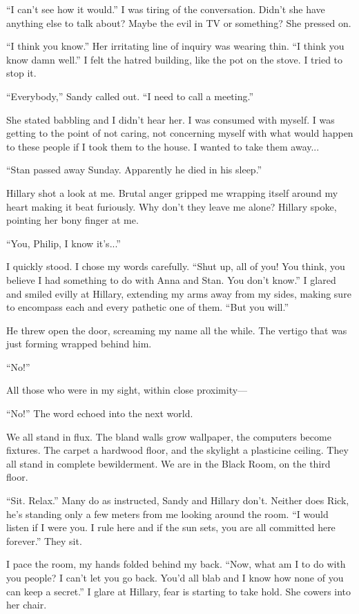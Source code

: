 \documentclass[
]{article}
\begin{document}
``I can't see how it would.'' I was tiring of the conversation. Didn't
she have anything else to talk about? Maybe the evil in TV or something?
She pressed on.

``I think you know.'' Her irritating line of inquiry was wearing thin.
``I think you know damn well.'' I felt the hatred building, like the pot
on the stove. I tried to stop it.

``Everybody,'' Sandy called out. ``I need to call a meeting.''

She stated babbling and I didn't hear her. I was consumed with myself. I
was getting to the point of not caring, not concerning myself with what
would happen to these people if I took them to the house. I wanted to
take them away...

``Stan passed away Sunday. Apparently he died in his sleep.''

Hillary shot a look at me. Brutal anger gripped me wrapping itself
around my heart making it beat furiously. Why don't they leave me alone?
Hillary spoke, pointing her bony finger at me.

``You, Philip, I know it's...''

I quickly stood. I chose my words carefully. ``Shut up, all of you! You
think, you believe I had something to do with Anna and Stan. You don't
know.'' I glared and smiled evilly at Hillary, extending my arms away
from my sides, making sure to encompass each and every pathetic one of
them. ``But you will.''

He threw open the door, screaming my name all the while. The vertigo
that was just forming wrapped behind him.

``No!''

All those who were in my sight, within close proximity---

``No!'' The word echoed into the next world.

We all stand in flux. The bland walls grow wallpaper, the computers
become fixtures. The carpet a hardwood floor, and the skylight a
plasticine ceiling. They all stand in complete bewilderment. We are in
the Black Room, on the third floor.

``Sit. Relax.'' Many do as instructed, Sandy and Hillary don't. Neither
does Rick, he's standing only a few meters from me looking around the
room. ``I would listen if I were you. I rule here and if the sun sets,
you are all committed here forever.'' They sit.

I pace the room, my hands folded behind my back. ``Now, what am I to do
with you people? I can't let you go back. You'd all blab and I know how
none of you can keep a secret.'' I glare at Hillary, fear is starting to
take hold. She cowers into her chair.
\end{document}
